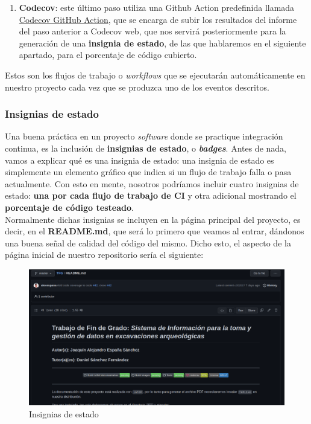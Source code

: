 \begin{enumerate}
\begin{enumerate}
\begin{enumerate}
                        \item \textbf{Codecov}: este último paso utiliza una Github Action
                        predefinida llamada
                        \href{https://github.com/marketplace/actions/codecov}{Codecov GitHub
                        Action}, que se encarga de subir los resultados del informe del paso
                        anterior a Codecov web, que nos servirá posteriormente para la
                        generación de una \textbf{insignia de estado}, de las que hablaremos
                        en el siguiente apartado, para el porcentaje de código cubierto.
                    \end{enumerate}
            \end{enumerate}
    \end{enumerate}

Estos son los flujos de trabajo o \textit{workflows} que se ejecutarán automáticamente en
nuestro proyecto cada vez que se produzca uno de los eventos descritos.

\subsubsection{Insignias de estado}
Una buena práctica en un proyecto \textit{software} donde se practique integración continua,
es la inclusión de \textbf{insignias de estado}, o \textbf{\textit{badges}}. Antes de nada,
vamos a explicar qué es una insignia de estado: una insignia de estado es simplemente un
elemento gráfico que indica si un flujo de trabajo falla o pasa actualmente. Con esto en
mente, nosotros podríamos incluir cuatro insignias de estado: \textbf{una por cada flujo de
trabajo de CI} y otra adicional mostrando el \textbf{porcentaje de código testeado}.\\

Normalmente dichas insignias se incluyen en la página principal del proyecto, es decir, en
el \textbf{README.md}, que será lo primero que veamos al entrar, dándonos una buena señal
de calidad del código del mismo. Dicho esto, el aspecto de la página inicial de nuestro
repositorio sería el siguiente:

    \begin{figure}[H]
        \centering
        \includegraphics[scale=0.27]{imagenes/badge-status.png}
        \caption{Insignias de estado}
        \label{fig:badge-status}
    \end{figure}

